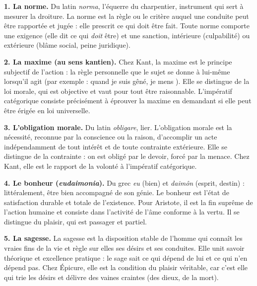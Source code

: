 \documentclass[11pt]{article}
\newcommand{\cle}[1]{{\popxbold\color{popdark}#1}}
\begin{document}
\begin{corrige}

\textbf{1. La \cle{norme}.} Du latin \emph{norma}, l'équerre du charpentier, instrument qui sert à mesurer la droiture. La norme est la règle ou le critère auquel une conduite peut être rapportée et jugée : elle prescrit ce qui doit être fait. Toute norme comporte une exigence (elle dit ce qui \emph{doit} être) et une sanction, intérieure (culpabilité) ou extérieure (blâme social, peine juridique).

\textbf{2. La \cle{maxime} (au sens kantien).} Chez Kant, la maxime est le principe subjectif de l'action : la règle personnelle que le sujet se donne à lui-même lorsqu'il agit (par exemple : \guillemotleft quand je suis gêné, je mens \guillemotright). Elle se distingue de la \cle{loi morale}, qui est objective et vaut pour tout être raisonnable. L'\cle{impératif catégorique} consiste précisément à éprouver la maxime en demandant si elle peut être érigée en loi universelle.

\textbf{3. L'\cle{obligation morale}.} Du latin \emph{obligare}, lier. L'obligation morale est la nécessité, reconnue par la conscience ou la raison, d'accomplir un acte indépendamment de tout intérêt et de toute contrainte extérieure. Elle se distingue de la \cle{contrainte} : on est obligé par le devoir, forcé par la menace. Chez Kant, elle est le rapport de la volonté à l'impératif catégorique.

\textbf{4. Le \cle{bonheur} (\emph{eudaimonia}).} Du grec \emph{eu} (bien) et \emph{daimôn} (esprit, destin) : littéralement, être bien accompagné de son génie. Le bonheur est l'état de satisfaction durable et totale de l'existence. Pour Aristote, il est la fin suprême de l'action humaine et consiste dans l'activité de l'âme conforme à la vertu. Il se distingue du \cle{plaisir}, qui est passager et partiel.

\textbf{5. La \cle{sagesse}.} La sagesse est la disposition stable de l'homme qui connaît les vraies fins de la vie et règle sur elles ses désirs et ses conduites. Elle unit savoir théorique et excellence pratique : le sage sait ce qui dépend de lui et ce qui n'en dépend pas. Chez Épicure, elle est la condition du plaisir véritable, car c'est elle qui trie les désirs et délivre des vaines craintes (des dieux, de la mort).
\end{corrige}
\end{document}

